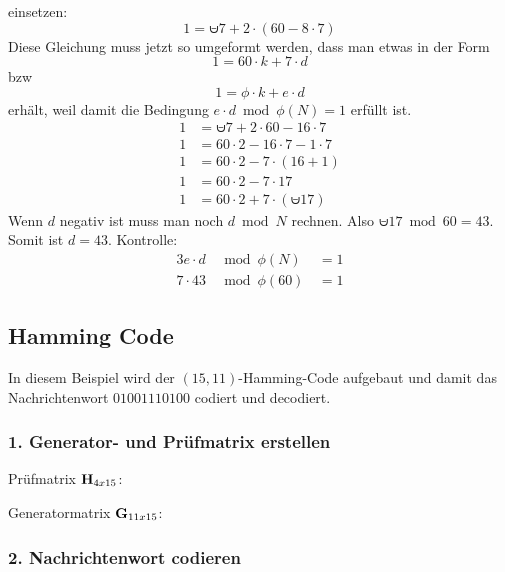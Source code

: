 einsetzen:
\begin{equation}
	1 = \uminus 7 + 2 \cdot (60 - 8 \cdot 7)
\end{equation}
Diese Gleichung muss jetzt so umgeformt werden, dass man etwas in der Form
\[
	1 = 60 \cdot k + 7 \cdot d
\]
bzw
\[
	1 = \phi \cdot k + e \cdot d
\]
erhält, weil damit die Bedingung $e \cdot d \bmod \phi(N) = 1$ erfüllt ist.
\begin{align}
1 & = \uminus 7 + 2 \cdot 60 - 16 \cdot 7 \\
1 & = 60 \cdot 2 - 16 \cdot 7 - 1 \cdot 7 \\
1 & = 60 \cdot 2 - 7 \cdot (16 + 1) \\
1 & = 60 \cdot 2 - 7 \cdot 17 \\
1 & = 60 \cdot 2 + 7 \cdot (\uminus 17)
\end{align}
Wenn $d$ negativ ist muss man noch $d \bmod N$ rechnen. Also $\uminus 17 \bmod
60 = 43$. Somit ist $d = 43$. Kontrolle:
\begin{alignat*}{3}
	e \cdot d & \bmod \phi(N) & \, = 1 \\
	7 \cdot 43 & \bmod \phi(60) & \, = 1
\end{alignat*}


\subsection{Hamming Code}
\label{example:hamming}

In diesem Beispiel wird der $(15,11)$-Hamming-Code aufgebaut und damit das
Nachrichtenwort $01001110100$ codiert und decodiert.

\subsubsection*{1. Generator- und Prüfmatrix erstellen}

Prüfmatrix $\mathbf{H}_{4x15}$:



Generatormatrix $\mathbf{G}_{11x15}$:



\subsubsection*{2. Nachrichtenwort codieren}

